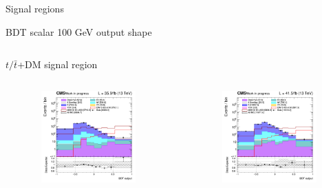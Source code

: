 \documentclass[8pt]{beamer}
\begin{document}
\begin{frame}[standout]
Signal regions
\end{frame}

\begin{frame}{BDT scalar 100 GeV output shape}
\begin{columns}
\begin{column}{1.09\textwidth}
\begin{block}{\centering $t/\bar t$+DM signal region}\end{block} \vspace{10pt}
\end{column}
\end{columns} \vspace{-24pt}
\begin{columns}
		\begin{column}{0.33\textwidth}
			\begin{center}
			\begin{block}{}\end{block}	
     			\includegraphics[width=1.0\textwidth, height=100pt]{figs/2016/SmearSR-ttDM-scalar100/log_cratio_topCR_ll_ST_BDT_output_scalar100_customBinsAttempt7.png}
    		\end{center}		
		\end{column} 
		\begin{column}{0.33\textwidth}
			\begin{center}
			\begin{block}{}\end{block}	
     			\includegraphics[width=1.0\textwidth, height=100pt]{figs/2017/SmearSR-ttDM-scalar100/log_cratio_topCR_ll_ST_BDT_output_scalar100_customBinsAttempt7.png}
    		\end{center}		
		\end{column} 

\end{columns}
\end{frame}
\end{document}
